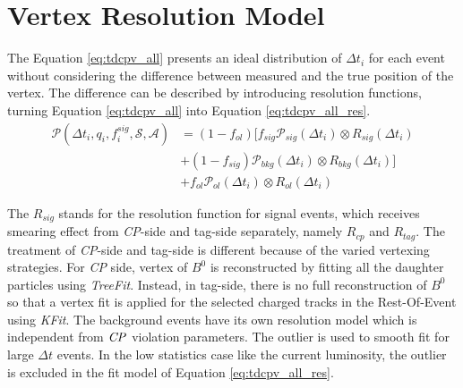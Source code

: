 \section{Vertex Resolution Model}

The Equation \ref{eq:tdcpv_all} presents an ideal distribution of $\Delta t_i$ for each event without considering the difference between measured and the true position of the vertex. The difference can be described by introducing resolution functions, turning Equation \ref{eq:tdcpv_all} into Equation \ref{eq:tdcpv_all_res}.
\begin{equation}\label{eq:tdcpv_all_res}
\begin{split}
\mathcal{P}(\Delta t_i,q_i,f_i^{sig},\mathcal{S},\mathcal{A})
&=(1-f_{ol})\text{[}f_{sig}\mathcal{P}_{sig}(\Delta t_i)\otimes R_{sig}(\Delta t_i)\\
&+(1-f_{sig})\mathcal{P}_{bkg}(\Delta t_i)\otimes R_{bkg}(\Delta t_i)
\text{]}\\
&+f_{ol}\mathcal{P}_{ol}(\Delta t_i)\otimes R_{ol}(\Delta t_i)
\end{split}
\end{equation}

The $R_{sig}$ stands for the resolution function for signal events, which receives smearing effect from \textit{CP}-side and tag-side separately, namely $R_{cp}$ and  $R_{tag}$. The treatment of \textit{CP}-side and tag-side is different because of the varied vertexing strategies. For \textit{CP} side, vertex of $B^0$ is reconstructed by fitting all the daughter particles using \textit{TreeFit}. Instead, in tag-side, there is no full reconstruction of $B^0$ so that a vertex fit is applied for the selected charged tracks in the Rest-Of-Event using \textit{KFit}. The background events have its own resolution model which is independent from  $\it{CP}$ violation parameters. The outlier is used to smooth fit for large $\Delta t$ events. In the low statistics case like the current luminosity, the outlier is excluded in the fit model of Equation \ref{eq:tdcpv_all_res}.

